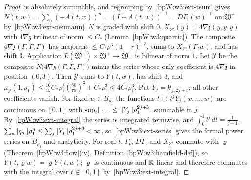 \begin{proof}
is absolutely summable, and regrouping by~\ref{bpW:w3:ext-tsum} gives
$N(t,w)=\sum_n(-A(t,w))^n=(I+A(t,w))^{-1}=D\Gamma_t(w)^{-1}$ on $\mathfrak W^+$ by~\ref{bpW:w3:ext-neumann}.
$N$ is graded with shift $0$.
\label{stepW:w3:majX}
$X_{Z'}(y)=4\nabla\mathfrak z(y,y,y)$ with $4\nabla\mathfrak z$ trilinear of norm $\le C_*$ (Lemma~\ref{bpW:w3:quartic}).
The composite $4\nabla\mathfrak z(\Gamma,\Gamma,\Gamma)$ has majorant $\le C_*\rho^3(1-r)^{-3}$, sums to
$X_{Z'}(\Gamma_tw)$, and has shift $3$.
\label{stepW:w3:majY}
Application $L(\mathfrak W^+)\times\mathfrak W^+\to\mathfrak W^+$ is bilinear of norm $1$. Let $\mathcal Y$ be the
composite $N\bigl(4\nabla\mathfrak z(\Gamma,\Gamma,\Gamma)\bigr)$ minus the series whose only coefficient is
$4\nabla\mathfrak z$ in position $(0,3)$. Then $\mathcal Y$ sums to $Y(t,w)$, has shift $3$, and
$\mu_{\mathcal Y}(1,\rho_1)\le\frac{16}{15}C_*\rho_1^3(\frac{80}{79})^3+C_*\rho_1^3\le4C_*\rho_1^3$. Put
$Y_j=\mathcal Y_{j,2j+3}$; all other coefficients vanish.
\label{stepW:w3:majint}
For fixed $w\in B_{\rho_1}$ the functions $t\mapsto t^jY_j(w,\dots,w)$ are continuous on $[0,1]$ with
$\sup_t\lVert \cdot\rVert_+\le\lVert Y_j\rVert\rho_1^{2j+3}$, summable in $j$. By~\ref{bpW:w3:ext-integral} the series is integrated
termwise, and $\int_0^1t^j\,dt=\frac1{j+1}$.
\label{stepW:w3:majps}
$\sum_n\lVert q_n\rVert\rho_1^n\le\sum_j\lVert Y_j\rVert\rho_1^{2j+3}<\infty$, so~\ref{bpW:w3:ext-series} gives the formal power
series on $B_{\rho_1}$ and analyticity.
\label{stepW:w3:majreal}
For real $t$, $\Gamma_t$, $D\Gamma_t$ and $X_{Z'}$ commute with $\varrho$ (Theorem~\ref{bpW:w3:flow}(iv),
Definition~\ref{bpW:w3:hamfield-def}), so $Y(t,\varrho w)=\varrho Y(t,w)$; $\varrho$ is continuous and $\mathbb{R}$-linear and
therefore commutes with the integral over $t\in[0,1]$ by~\ref{bpW:w3:ext-integral}.
\end{proof}

